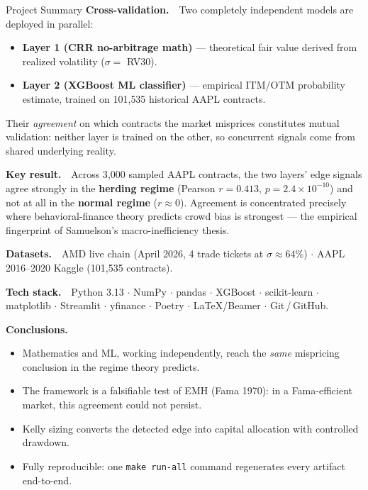\documentclass[final]{beamer}
\begin{document}
\begin{frame}[t]
\begin{columns}[T]
\begin{block}{Project Summary}
  \vspace{0.4cm}
  \textbf{\color{navymid} Cross-validation.}\ \
  Two completely independent models are deployed in parallel:
  \begin{itemize}
    \setlength{\itemsep}{0.18cm}
    \item \textbf{Layer 1 (CRR no-arbitrage math)} --- theoretical fair
          value derived from realized volatility ($\sigma = $ RV30).
    \item \textbf{Layer 2 (XGBoost ML classifier)} --- empirical
          ITM/OTM probability estimate, trained on 101{,}535 historical
          AAPL contracts.
  \end{itemize}
  Their \emph{agreement} on which contracts the market misprices
  constitutes mutual validation: neither layer is trained on the
  other, so concurrent signals come from shared underlying reality.

  \vspace{0.4cm}
  \textbf{\color{navymid} Key result.}\ \
  Across 3{,}000 sampled AAPL contracts, the two layers' edge signals
  agree strongly in the \textbf{herding regime} (Pearson
  $r = 0.413$, $p = 2.4\times10^{-10}$) and not at all in the
  \textbf{normal regime} ($r \approx 0$). Agreement is concentrated
  precisely where behavioral-finance theory predicts crowd bias is
  strongest --- the empirical fingerprint of Samuelson's
  macro-inefficiency thesis.

  \vspace{0.4cm}
  \textbf{\color{navymid} Datasets.}\ \
  AMD live chain (April 2026, 4 trade tickets at $\sigma \approx 64\%$)
  $\cdot$ AAPL 2016--2020 Kaggle (101{,}535 contracts).

  \vspace{0.4cm}
  \textbf{\color{navymid} Tech stack.}\ \
  Python 3.13 $\cdot$ NumPy $\cdot$ pandas $\cdot$ XGBoost $\cdot$
  scikit-learn $\cdot$ matplotlib $\cdot$ Streamlit $\cdot$ yfinance
  $\cdot$ Poetry $\cdot$ LaTeX/Beamer $\cdot$ Git\,/\,GitHub.

  \vspace{0.4cm}
  \textbf{\color{navymid} Conclusions.}
  \begin{itemize}
    \setlength{\itemsep}{0.18cm}
    \item Mathematics and ML, working independently, reach the
          \emph{same} mispricing conclusion in the regime theory
          predicts.
    \item The framework is a falsifiable test of EMH
          (Fama 1970): in a Fama-efficient market, this agreement
          could not persist.
    \item Kelly sizing converts the detected edge into capital
          allocation with controlled drawdown.
    \item Fully reproducible: one \texttt{make run-all} command
          regenerates every artifact end-to-end.
  \end{itemize}
\end{block}


\end{columns}
\end{frame}
\end{document}
